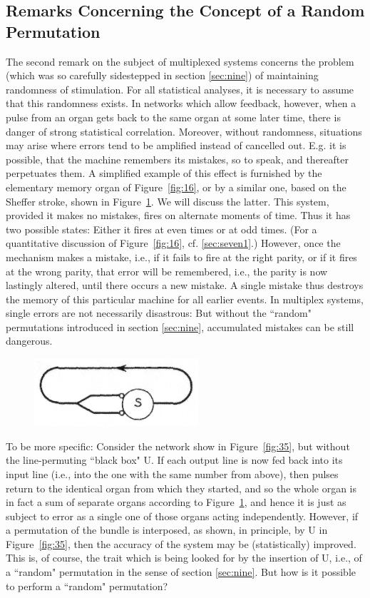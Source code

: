 \documentclass[twocolumn,preprintnumbers,amsmath,amssymb,floatfix]{revtex4}
\begin{document}
\subsection{\label{sec:eleven2}Remarks Concerning the Concept of a Random Permutation}

The second remark on the subject of multiplexed systems concerns
the problem (which was so carefully sidestepped in section
\ref{sec:nine}) of maintaining randomness of stimulation. For all
statistical analyses, it is necessary to assume that this
randomness exists. In networks which allow feedback, however, when
a pulse from an organ gets back to the same organ at some later
time, there is danger of strong statistical correlation. Moreover,
without randomness, situations may arise where errors tend to be
amplified instead of cancelled out. E.g. it is possible, that the
machine remembers its mistakes, so to speak, and thereafter
perpetuates them. A simplified example of this effect is furnished
by the elementary memory organ of Figure~\ref{fig:16}, or by a
similar one, based on the Sheffer stroke, shown in
Figure~\ref{fig:39}. We will discuss the latter. This system,
provided it makes no mistakes, fires on alternate moments of time.
Thus it has two possible states: Either it fires at even times or
at odd times. (For a quantitative discussion of
Figure~\ref{fig:16}, cf. \ref{sec:seven1}.) However, once the
mechanism makes a mistake, i.e., if it fails to fire at the right
parity, or if it fires at the wrong parity, that error will be
remembered, i.e., the parity is now lastingly altered, until there
occurs a new mistake. A single mistake thus destroys the memory of
this particular machine for all earlier events. In multiplex
systems, single errors are not necessarily disastrous: But without
the ``random" permutations introduced in section \ref{sec:nine},
accumulated mistakes can be still dangerous.

\begin{figure}
\includegraphics[width=2.4in]{fig_39}
\caption{\label{fig:39}}
\end{figure}

To be more specific: Consider the network show in
Figure~\ref{fig:35}, but without the line-permuting ``black box"
\textsf{U}. If each output line is now fed back into its input
line (i.e., into the one with the same number from above), then
pulses return to the identical organ from which they started, and
so the whole organ is in fact a sum of separate organs according
to Figure~\ref{fig:39}, and hence it is just as subject to error
as a single one of those organs acting independently. However, if
a permutation of the bundle is interposed, as shown, in principle,
by \textsf{U} in Figure~\ref{fig:35}, then the accuracy of the
system may be (statistically) improved. This is, of course, the
trait which is being looked for by the insertion of \textsf{U},
i.e., of a ``random" permutation in the sense of section
\ref{sec:nine}. But how is it possible to perform a ``random"
permutation?
\end{document}
